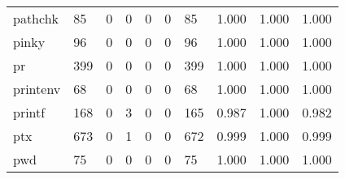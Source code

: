 \begin{longtable}{lp{2.0cm}p{2.0cm}p{2.0cm}p{2.0cm}p{2.0cm}p{2.0cm}p{2.0cm}p{2.0cm}p{2.0cm}}
pathchk   &                     85 &                                             0 &                                            0 &                                           0 &                                            0 &                                         85 &                                1.000 &                                  1.000 &                                1.000 \\
pinky     &                     96 &                                             0 &                                            0 &                                           0 &                                            0 &                                         96 &                                1.000 &                                  1.000 &                                1.000 \\
pr        &                    399 &                                             0 &                                            0 &                                           0 &                                            0 &                                        399 &                                1.000 &                                  1.000 &                                1.000 \\
printenv  &                     68 &                                             0 &                                            0 &                                           0 &                                            0 &                                         68 &                                1.000 &                                  1.000 &                                1.000 \\
printf    &                    168 &                                             0 &                                            3 &                                           0 &                                            0 &                                        165 &                                0.987 &                                  1.000 &                                0.982 \\
ptx       &                    673 &                                             0 &                                            1 &                                           0 &                                            0 &                                        672 &                                0.999 &                                  1.000 &                                0.999 \\
pwd       &                     75 &                                             0 &                                            0 &                                           0 &                                            0 &                                         75 &                                1.000 &                                  1.000 &                                1.000 \\

\end{longtable}
